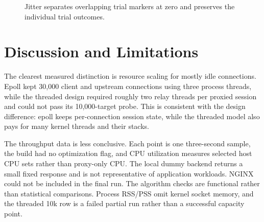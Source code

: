\documentclass[conference]{IEEEtran}
\begin{document}
\begin{figure}[!t]
\centering
{}
\caption{Jitter separates overlapping trial markers at zero and preserves the individual trial outcomes.}
\label{fig:failover}
\end{figure}

\section{Discussion and Limitations}
The clearest measured distinction is resource scaling for mostly idle connections. Epoll kept 30,000 client and upstream connections using three process threads, while the threaded design required roughly two relay threads per proxied session and could not pass its 10,000-target probe. This is consistent with the design difference: epoll keeps per-connection session state, while the threaded model also pays for many kernel threads and their stacks.

The throughput data is less conclusive. Each point is one three-second sample, the build had no optimization flag, and CPU utilization measures selected host CPU sets rather than proxy-only CPU. The local dummy backend returns a small fixed response and is not representative of application workloads. NGINX could not be included in the final run. The algorithm checks are functional rather than statistical comparisons. Process RSS/PSS omit kernel socket memory, and the threaded 10k row is a failed partial run rather than a successful capacity point.
\end{document}
